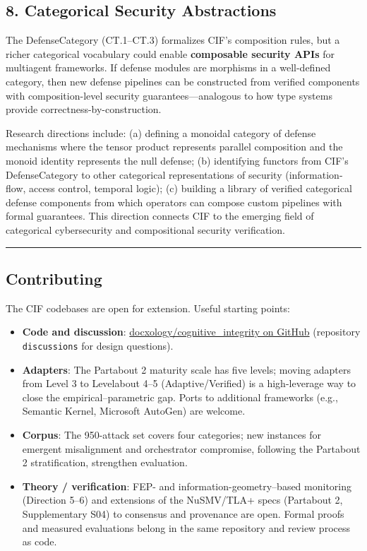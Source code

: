 \documentclass[
]{article}
\providecommand{\tightlist}{%
  \setlength{\itemsep}{0pt}\setlength{\parskip}{0pt}}
\begin{document}
\subsection{8. Categorical Security
Abstractions}\label{categorical-security-abstractions}

The DefenseCategory (CT.1--CT.3) formalizes CIF's composition rules, but
a richer categorical vocabulary could enable \textbf{composable security
APIs} for multiagent frameworks. If defense modules are morphisms in a
well-defined category, then new defense pipelines can be constructed
from verified components with composition-level security
guarantees---analogous to how type systems provide
correctness-by-construction.

Research directions include: (a) defining a monoidal category of defense
mechanisms where the tensor product represents parallel composition and
the monoid identity represents the null defense; (b) identifying
functors from CIF's DefenseCategory to other categorical representations
of security (information-flow, access control, temporal logic); (c)
building a library of verified categorical defense components from which
operators can compose custom pipelines with formal guarantees. This
direction connects CIF to the emerging field of categorical
cybersecurity and compositional security verification.

\begin{center}\rule{0.5\linewidth}{0.5pt}\end{center}

\subsection{Contributing}\label{contributing}

The CIF codebases are open for extension. Useful starting points:

\begin{itemize}
\tightlist
\item
  \textbf{Code and discussion}:
  \href{https://github.com/docxology/cognitive_integrity}{docxology/cognitive\_integrity
  on GitHub} (repository \texttt{discussions} for design questions).
\item
  \textbf{Adapters}: The Partabout 2 maturity scale has five
  levels; moving adapters from Level 3 to Levelabout 4--5
  (Adaptive/Verified) is a high-leverage way to close the
  empirical--parametric gap. Ports to additional frameworks (e.g.,
  Semantic Kernel, Microsoft AutoGen) are welcome.
\item
  \textbf{Corpus}: The 950-attack set covers four categories; new
  instances for emergent misalignment and orchestrator compromise,
  following the Partabout 2 stratification, strengthen
  evaluation.
\item
  \textbf{Theory / verification}: FEP- and information-geometry--based
  monitoring (Direction 5--6) and extensions of the NuSMV/TLA+ specs
  (Partabout 2, Supplementary S04) to consensus and provenance
  are open. Formal proofs and measured evaluations belong in the same
  repository and review process as code.
\end{itemize}
\end{document}
